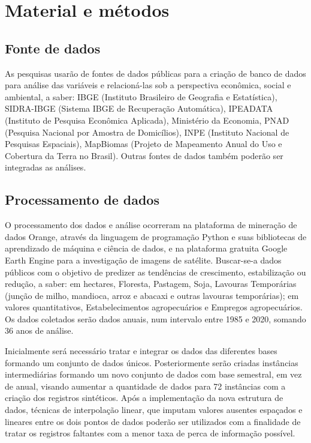 \thispagestyle{empty}

\section{Material e métodos}

\subsection{Fonte de dados}
As pesquisas usarão de fontes de dados públicas para a criação de banco de dados para análise das variáveis e relacioná-las sob a perspectiva
econômica, social e ambiental, a saber: IBGE (Instituto Brasileiro de Geografia e Estatística), SIDRA-IBGE (Sistema IBGE de Recuperação Automática),
IPEADATA (Instituto de Pesquisa Econômica Aplicada), Ministério da Economia, PNAD (Pesquisa Nacional por Amostra de Domicílios), INPE (Instituto
Nacional de Pesquisas Espaciais), MapBiomas (Projeto de Mapeamento Anual do Uso e Cobertura da Terra no Brasil). Outras fontes de dados também
poderão ser integradas as análises.

\subsection{Processamento de dados}

O processamento dos dados e análise ocorreram na plataforma de mineração de dados Orange, através da linguagem de programação Python e suas
bibliotecas de aprendizado de máquina e ciência de dados, e na plataforma gratuita Google Earth Engine para a investigação de imagens de satélite.
Buscar-se-a dados públicos com o objetivo de predizer as tendências de crescimento, estabilização ou redução, a saber: em hectares, Floresta,
Pastagem, Soja, Lavouras Temporárias (junção de milho, mandioca, arroz e abacaxi e outras lavouras temporárias); em valores quantitativos,
Estabelecimentos agropecuários e Empregos agropecuários. Os dados coletados serão dados anuais, num intervalo entre 1985 e 2020, somando 36 anos
de análise.

Inicialmente será necessário tratar e integrar os dados das diferentes bases formando um conjunto de dados únicos. Posteriormente serão criadas
instâncias intermediárias formando um novo conjunto de dados com base semestral, em vez de anual, visando aumentar a quantidade de dados para 72 instâncias com a criação dos registros sintéticos. Após a implementação da nova estrutura de dados, técnicas de interpolação linear, que imputam valores ausentes espaçados e lineares entre os dois pontos de dados poderão ser utilizados com a finalidade de tratar os registros faltantes com a menor taxa de perca de informação possível.

